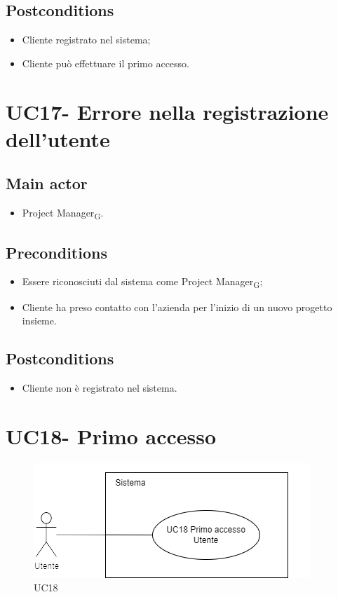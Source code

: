 \documentclass{article}
\begin{document}
    \subsection*{Postconditions}
        \begin{itemize}
            \item Cliente registrato nel sistema;
            \item Cliente può effettuare il primo accesso.
        \end{itemize}

\section{UC17- Errore nella registrazione dell'utente}
\subsection*{Main actor}
        \begin{itemize}
            \item Project Manager\textsubscript{G}.
        \end{itemize}
        
    \subsection*{Preconditions}
        \begin{itemize}
            \item Essere riconosciuti dal sistema come Project Manager\textsubscript{G};
            \item Cliente ha preso contatto con l'azienda per l'inizio di un nuovo progetto insieme.
        \end{itemize}
        
    \subsection*{Postconditions}
        \begin{itemize}
            \item Cliente non è registrato nel sistema.
        \end{itemize}
\section{UC18- Primo accesso}
 \begin{figure}[h]
          \centering
          \includegraphics{./imgUML/UC18.png}
            \caption{UC18}
          \label{fig:UC18}
        \end{figure}
\end{document}

